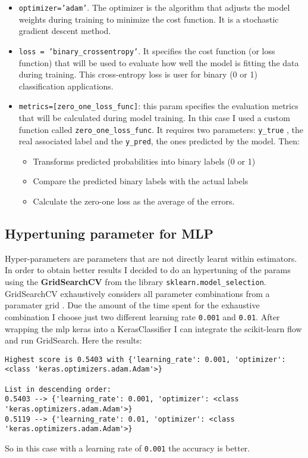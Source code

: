 \begin{itemize}
\begin{itemize}
\item \texttt{optimizer='adam'}. The optimizer is the algorithm that adjusts the model weights during training to minimize the cost function. It is a stochastic gradient descent method.
\item \texttt{loss = 'binary\_crossentropy'}. It specifies the cost function (or loss function) that will be used to evaluate how well the model is fitting the data during training. This cross-entropy loss is user for binary (0 or 1) classification applications.
\item \texttt{metrics=[zero\_one\_loss\_func]}: this param specifies the evaluation metrics that will be calculated during model training. In this case I used a custom function called \texttt{zero\_one\_loss\_func}. It requires two parameters: \texttt{y\_true} , the real associated label and the \texttt{y\_pred}, the ones predicted by the model. Then:
\begin{itemize}
\item Transforms predicted probabilities into binary labels (0 or 1)
\item Compare the predicted binary labels with the actual labels
\item Calculate the zero-one loss as the average of the errors.
\end{itemize}
\end{itemize}
\end{itemize}
\subsection{Hypertuning parameter for MLP}
Hyper-parameters are parameters that are not directly learnt within estimators.
In order to obtain better results I decided to do an hypertuning of the params using the \textbf{GridSearchCV} from the library \texttt{sklearn.model\_selection}.  GridSearchCV exhaustively considers all parameter combinations from a paramater grid \cite{scikitgs}.
Due the amount of the time spent for the exhaustive combination I choose just two different learning rate \texttt{0.001} and  \texttt{0.01}.
After wrapping the mlp keras into a KerasClassifier I can integrate the scikit-learn flow and run GridSearch. Here the results:
\begin{lstlisting}
Highest score is 0.5403 with {'learning_rate': 0.001, 'optimizer': <class 'keras.optimizers.adam.Adam'>} 

List in descending order:
0.5403 --> {'learning_rate': 0.001, 'optimizer': <class 'keras.optimizers.adam.Adam'>} 
0.5119 --> {'learning_rate': 0.01, 'optimizer': <class 'keras.optimizers.adam.Adam'>} 
\end{lstlisting}
So in this case with a learning rate of \texttt{0.001} the accuracy is better.
